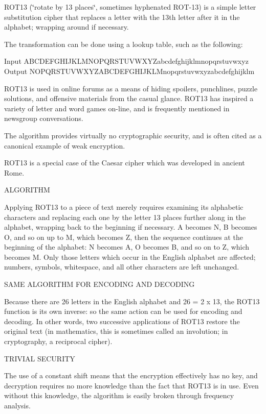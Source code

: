 R\+O\+T13 (\char`\"{}rotate by 13 places\char`\"{}, sometimes hyphenated R\+O\+T-\/13) is a simple letter substitution cipher that replaces a letter with the 13th letter after it in the alphabet; wrapping around if necessary.

The transformation can be done using a lookup table, such as the following\+:

Input A\+B\+C\+D\+E\+F\+G\+H\+I\+J\+K\+L\+M\+N\+O\+P\+Q\+R\+S\+T\+U\+V\+W\+X\+Y\+Zabcdefghijklmnopqrstuvwxyz Output N\+O\+P\+Q\+R\+S\+T\+U\+V\+W\+X\+Y\+Z\+A\+B\+C\+D\+E\+F\+G\+H\+I\+J\+K\+L\+Mnopqrstuvwxyzabcdefghijklm

R\+O\+T13 is used in online forums as a means of hiding spoilers, punchlines, puzzle solutions, and offensive materials from the casual glance. R\+O\+T13 has inspired a variety of letter and word games on-\/line, and is frequently mentioned in newsgroup conversations.

The algorithm provides virtually no cryptographic security, and is often cited as a canonical example of weak encryption.

R\+O\+T13 is a special case of the Caesar cipher which was developed in ancient Rome.

A\+L\+G\+O\+R\+I\+T\+HM

Applying R\+O\+T13 to a piece of text merely requires examining its alphabetic characters and replacing each one by the letter 13 places further along in the alphabet, wrapping back to the beginning if necessary. A becomes N, B becomes O, and so on up to M, which becomes Z, then the sequence continues at the beginning of the alphabet\+: N becomes A, O becomes B, and so on to Z, which becomes M. Only those letters which occur in the English alphabet are affected; numbers, symbols, whitespace, and all other characters are left unchanged.

S\+A\+ME A\+L\+G\+O\+R\+I\+T\+HM F\+OR E\+N\+C\+O\+D\+I\+NG A\+ND D\+E\+C\+O\+D\+I\+NG

Because there are 26 letters in the English alphabet and 26 = 2 x 13, the R\+O\+T13 function is its own inverse\+: so the same action can be used for encoding and decoding. In other words, two successive applications of R\+O\+T13 restore the original text (in mathematics, this is sometimes called an involution; in cryptography, a reciprocal cipher).

T\+R\+I\+V\+I\+AL S\+E\+C\+U\+R\+I\+TY

The use of a constant shift means that the encryption effectively has no key, and decryption requires no more knowledge than the fact that R\+O\+T13 is in use. Even without this knowledge, the algorithm is easily broken through frequency analysis.

